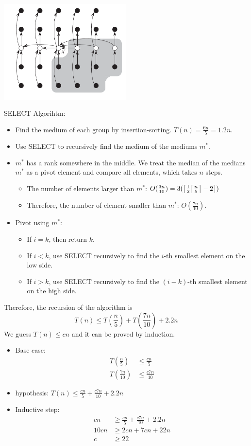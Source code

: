 \documentclass[en,hazy,blue,screen,14pt]{elegantnote}
\DeclarePairedDelimiter{\ceil}{\lceil}{\rceil}
\begin{document}
\centerline{\includegraphics[width=0.5\textwidth]{deterministic-select.png}}

SELECT Algorihtm:
\begin{itemize}
\item Find the medium of each group by insertion-sorting. $T(n) = \frac{6n}{5} 
= 1.2n$.
\item Use SELECT to recursively find the medium of the mediums $m^*$.
\item $m^*$ has a rank somewhere in the middle.
We treat the median of the medians $m^*$ as a pivot element and compare all 
elements, which takes $n$ steps.
    \begin{itemize}
        \item The number of elements larger than $m^*$: $O(\frac{3n}{10}) 
    =3(\ceil*{\frac{1}{2}\ceil*{\frac{n}{5}} - 2})$
        \item Therefore, the number of element smaller than $m^*$: 
    $O(\frac{7n}{10})$.
    \end{itemize}
\item Pivot using $m^*$:
    \begin{itemize}
     \item If $i = k$, then return $k$.
     \item If $i < k$, use SELECT recursively to find the $i$-th smallest 
element on the low side.
     \item If $i > k$, use SELECT recursively to find the $(i-k)$-th smallest 
element on the high side.
    \end{itemize}
\end{itemize}
Therefore, the recursion of the algorithm is
\[T(n) \le T(\frac{n}{5}) + T(\frac{7n}{10}) + 2.2n\]
We guess $T(n) \le cn$ and it can be proved by induction.
\begin{itemize}
\item Base case:
    \begin{align*}
    T(\frac{n}{5}) &\le \frac{cn}{5}\\
    T(\frac{7n}{10}) &\le \frac{c7n}{10}
    \end{align*}
\item hypothesis: $T(n) \le \frac{cn}{5} + \frac{c7n}{10} + 2.2n$
\item Inductive step:
    \begin{align*}
    cn &\ge \frac{cn}{5} + \frac{c7n}{10} + 2.2n\\
    10 cn &\ge 2cn + 7cn + 22n\\
    c &\ge 22
    \end{align*}

\end{itemize}
\end{document}
